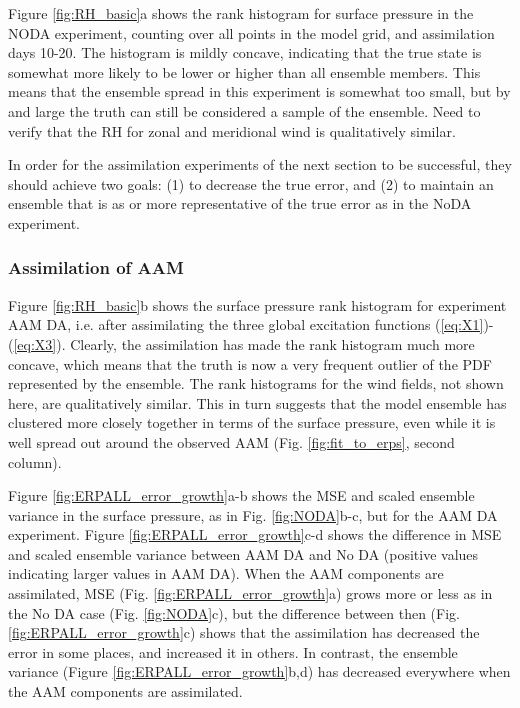 Figure \ref{fig:RH_basic}a shows the rank histogram for surface pressure in the NODA experiment, counting over all points in the model grid, and assimilation days 10-20. 
The histogram is mildly concave, indicating that the true state is somewhat more likely to be lower or higher than all ensemble members.
This means that the ensemble spread in this experiment is somewhat too small, \textcolor{unsure}{but by and large the truth can still be considered a sample of the ensemble}.  
\textcolor{alert}{Need to verify that the RH for zonal and meridional wind is qualitatively similar.}

In order for the assimilation experiments of the next section to be successful, they should achieve two goals: (1) to decrease the true error, and (2) to maintain an ensemble that is as or more representative of the true error as in the NoDA experiment.

\subsubsection{Assimilation of AAM}

Figure \ref{fig:RH_basic}b shows the surface pressure rank histogram for experiment AAM DA, i.e. after assimilating the three global excitation functions (\ref{eq:X1})-(\ref{eq:X3}).  
Clearly, the assimilation has made the rank histogram much more concave, which means that the truth is now a very frequent outlier of the PDF represented by the ensemble.
The rank histograms for the  wind fields, not shown here, are qualitatively similar.
This in turn suggests that the model ensemble has clustered more closely together in terms of the surface pressure, even while it is well spread out around the observed AAM (Fig. \ref{fig:fit_to_erps}, second column).

Figure \ref{fig:ERPALL_error_growth}a-b shows the MSE and scaled ensemble variance in the surface pressure, as in Fig. \ref{fig:NODA}b-c, but for the AAM DA experiment. 
Figure \ref{fig:ERPALL_error_growth}c-d shows the difference in MSE and scaled ensemble variance between AAM DA and No DA (positive values indicating larger values in AAM DA).  
When the AAM components are assimilated, MSE (Fig. \ref{fig:ERPALL_error_growth}a) grows more or less as in the No DA case (Fig. \ref{fig:NODA}c), but the difference between then (Fig. \ref{fig:ERPALL_error_growth}c) shows that the assimilation has decreased the error in some places, and increased it in others.
In contrast, the ensemble variance (Figure \ref{fig:ERPALL_error_growth}b,d) has decreased everywhere when the AAM components are assimilated.  




